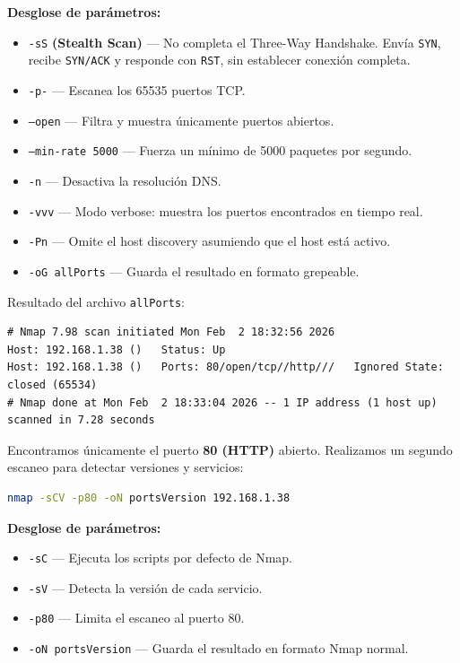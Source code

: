 \documentclass[12pt,a4paper]{article}
\newcommand{\cmd}[1]{%
  \colorbox{inlinebg}{\texttt{\small\color{wlcyan}#1}}%
}
\begin{document}
\begin{notebox}
  \textbf{Desglose de parámetros:}
  \begin{itemize}
    \item \cmd{-sS} \textbf{(Stealth Scan)} — No completa el Three-Way Handshake. Envía \texttt{SYN}, recibe \texttt{SYN/ACK} y responde con \texttt{RST}, sin establecer conexión completa.
    \item \cmd{-p-} — Escanea los 65535 puertos TCP.
    \item \cmd{--open} — Filtra y muestra únicamente puertos abiertos.
    \item \cmd{--min-rate 5000} — Fuerza un mínimo de 5000 paquetes por segundo.
    \item \cmd{-n} — Desactiva la resolución DNS.
    \item \cmd{-vvv} — Modo verbose: muestra los puertos encontrados en tiempo real.
    \item \cmd{-Pn} — Omite el host discovery asumiendo que el host está activo.
    \item \cmd{-oG allPorts} — Guarda el resultado en formato grepeable.
  \end{itemize}
\end{notebox}

Resultado del archivo \texttt{allPorts}:

\begin{lstlisting}[style=output]
# Nmap 7.98 scan initiated Mon Feb  2 18:32:56 2026
Host: 192.168.1.38 ()   Status: Up
Host: 192.168.1.38 ()   Ports: 80/open/tcp//http///   Ignored State: closed (65534)
# Nmap done at Mon Feb  2 18:33:04 2026 -- 1 IP address (1 host up) scanned in 7.28 seconds
\end{lstlisting}

Encontramos únicamente el puerto \textbf{80 (HTTP)} abierto. Realizamos un segundo escaneo para detectar versiones y servicios:

\begin{lstlisting}[language=bash]
nmap -sCV -p80 -oN portsVersion 192.168.1.38
\end{lstlisting}

\begin{notebox}
  \textbf{Desglose de parámetros:}
  \begin{itemize}
    \item \cmd{-sC} — Ejecuta los scripts por defecto de Nmap.
    \item \cmd{-sV} — Detecta la versión de cada servicio.
    \item \cmd{-p80} — Limita el escaneo al puerto 80.
    \item \cmd{-oN portsVersion} — Guarda el resultado en formato Nmap normal.
  \end{itemize}
\end{notebox}
\end{document}

